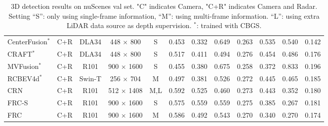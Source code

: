 \begin{table*}[!htb]
{\begin{tabular}{l|c|c|c|S|S|S|SSSSS}
CenterFusion${}^{\ast }$  & C+R & DLA34& 448 $\times$ 800  & S & 0.453  & 0.332  & 0.649 & 0.263 & 0.535 & 0.540 & 0.142 \\
CRAFT${}^{\ast }$         & C+R & DLA34& 448 $\times$ 800  & S & 0.517  & 0.411  & 0.494 & 0.276 & 0.454 & 0.486 & 0.176 \\
MVFusion${}^{\ast }$      & C+R & R101 & 900 $\times$ 1600 & S & 0.455  & 0.380  & 0.675 & 0.258 & 0.372 & 0.833 & 0.196 \\
RCBEV4d${}^{\ast }$         & C+R & Swin-T   & 256 $\times$ 704 & M & 0.497 & 0.381 & 0.526 & 0.272 & 0.445 & 0.465 & 0.185 \\
CRN           & C+R & R101 & 512 $\times$ 1408 & M,L & 0.592  & 0.525  & 0.460 & 0.273 & 0.443 & 0.352 & 0.180 \\
FRC-S           & C+R & R101 & 900 $\times$ 1600 & S & 0.575   & 0.559  & 0.559 & 0.275 & 0.385 & 0.267 & 0.181 \\
FRC           & C+R & R101 & 900 $\times$ 1600 & M & 0.586  & 0.492  & 0.543 & 0.270 & 0.340 & 0.270 & 0.174 \\
\bottomrule
\end{tabular}
}
\caption{3D detection results on nuScenes val set. "C" indicates Camera, "C+R" indicates Camera and Radar. Setting “S”: only using single-frame information,
“M”: using multi-frame information. “L”: using extra LiDAR data source as depth supervision. ${}^{\ast }$: trained with CBGS.}
\end{table*}        

